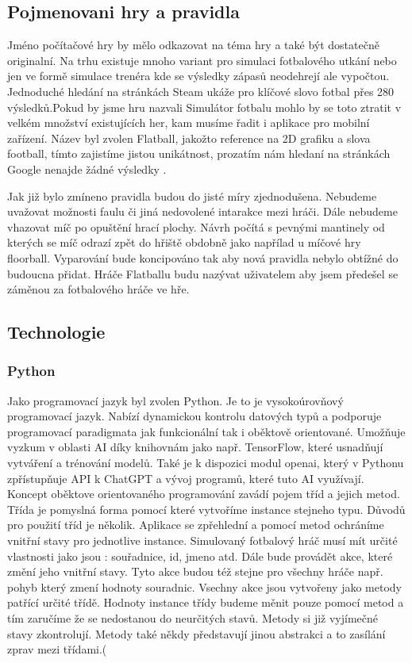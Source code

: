 \documentclass[
  program=ainfk,
  biblatex,
  language=czech,
  figures=true,
  tables ,
  sourcecodes=true,
  glossaries=true,
  index
]{kidiplom}
\begin{document}
\subsection{Pojmenovani hry a pravidla }
 Jméno počítačové hry by mělo odkazovat na téma hry a také být dostatečně originalní. Na trhu existuje mnoho variant pro simulaci fotbalového utkání nebo jen ve formě simulace trenéra kde se výsledky zápasů neodehrejí ale vypočtou. Jednoduché hledání na stránkách Steam \cite{3} ukáže pro klíčové slovo fotbal přes 280 výsledků.Pokud by jsme hru nazvali Simulátor fotbalu mohlo by se toto ztratit v velkém množství existujících her, kam musíme řadit i aplikace pro mobilní zařízení.  Název byl zvolen Flatball, jakožto reference na 2D grafiku a slova football, tímto zajistíme jistou unikátnost, prozatím nám hledaní na stránkách Google nenajde žádné výsledky . 

Jak již bylo zmíneno pravidla budou do jisté míry zjednodušena. Nebudeme uvažovat možnosti faulu či jiná nedovolené intarakce mezi hráči. Dále nebudeme vhazovat míč po opuštění hrací plochy. Návrh počítá s pevnými mantinely od kterých se míč odrazí zpět do hřiště obdobně jako napřílad u míčové hry floorball.  Vyparování bude koncipováno tak aby nová pravidla nebylo obtížné do budoucna přidat. Hráče Flatballu budu nazývat uživatelem aby jsem předešel se záměnou za fotbalového hráče ve hře.  

 
\subsection{Technologie }

\subsubsection{Python}

 Jako programovací jazyk byl zvolen Python. Je to  je vysokoúrovňový programovací jazyk.  Nabízí dynamickou kontrolu datových typů a podporuje programovací paradigmata jak funkcionální tak i oběktově orientované. Umožňuje vyzkum  v oblasti AI díky knihovnám jako např. TensorFlow, které usnadňují vytváření a trénování modelů. Také je k dispozici modul openai, který v Pythonu zpřístupňuje API k ChatGPT  a vývoj programů, které tuto AI využívají.\cite{4} 
 Koncept oběktove orientovaného programování zavádí pojem tříd a jejich metod. Třída je pomyslná forma pomocí které vytvoříme instance stejneho typu. Důvodů pro použití tříd je několik. Aplikace se zpřehlední a pomocí metod  ochráníme vnitřní stavy pro jednotlive instance. Simulovaný fotbalový hráč musí mít určité vlastnosti jako jsou : souřadnice, id, jmeno atd. Dále bude provádět akce, které změní jeho vnitřní stavy. Tyto akce budou též stejne pro všechny hráče např. pohyb který zmení hodnoty souradnic. Vsechny  akce jsou vytvořeny jako metody patřící určité třídě. Hodnoty instance třídy budeme měnit pouze pomocí metod a tím zaručíme že se nedostanou do neurčitých stavů. Metody si již vyjímečné stavy zkontrolují. Metody také někdy představují jinou  abstrakci a to  zasílání zprav mezi třídami.( \cite{5}   
\end{document}
